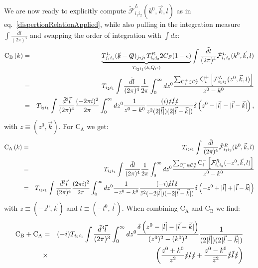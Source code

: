 \documentclass[11pt]{article}
\begin{document}
We are now ready to explicitly compute $\mathcal{\tilde{F}}^{L}_{i_1i_2}(k^0, \vec{k},l)$ as in eq.~\ref{dispertionRelationApplied}, while also pulling in the integration measure $\int \frac{\tilde{d} l}{(2\pi)^4}$ and swapping the order of integration with $\int d z$:
\begin{eqnarray}
\label{CBexplicit}
\textrm{C}_\textrm{B}\left(k \right) &=& \underbrace{T^{L}_{j_1 i_1} (\slashed{k}-\slashed{Q})_{j_2 j_1} T^{R}_{i_2 j_2} 2 C_F (1-\epsilon)  }_{T_{i_2 i_1}(k,Q,\epsilon)}  \int \frac{\tilde{d} l}{(2\pi)^4} \mathcal{\tilde{F}}^{L}_{i_1i_2}(k^0, \vec{k},l) \nonumber\\
&=&T_{i_2 i_1}  \int \frac{\tilde{d} l}{(2\pi)^4}  \frac{1}{2\pi} \int_{0}^\infty d z^0 \frac{ \sum_{\textrm{C}^+_i\in\mathcal{C}_\mathcal{F}^{L}} \textrm{C}^+_i\left[ \mathcal{F}^{L}_{i_1i_2}(z^0, \vec{k},l)\right ] }{z^0-k^0} \nonumber \\
&=&T_{i_2 i_1}  \int \frac{\tilde{d}^3 \vec{l}}{(2\pi)^4}  \frac{(-2\pi i)^2}{2\pi} \int_{0}^\infty d z^0 \frac{1}{z^0-k^0} \frac{(i)\slashed{z}\slashed{l}\slashed{z}}{z^2 (2 |\vec{l}|) (2 |\vec{l}-\vec{k}|)} \delta \left(z^0-|\vec{l}|-|\vec{l}-\vec{k}|\right), \nonumber \\
\end{eqnarray}
with $z\equiv(z^0,\vec{k})$.
For $\textrm{C}_\textrm{A}$ we get:
\begin{eqnarray}
\label{CAexplicit}
\textrm{C}_\textrm{A}\left(k \right) &=& T_{i_2 i_1} \int \frac{\tilde{d} l}{(2\pi)^4} \mathcal{\tilde{F}}^{R}_{i_1i_2}(k^0, \vec{k},l)\nonumber\\
&=&T_{i_2 i_1}  \int \frac{\tilde{d} l}{(2\pi)^4}  \frac{1}{2\pi} \int_{0}^\infty d z^0 \frac{ \sum_{\textrm{C}^-_i\in\mathcal{C}_\mathcal{F}^{R}} \textrm{C}^-_i\left[ \mathcal{F}^{R}_{i_1i_2}(-z^0, \vec{k},l)\right ] }{z^0-k^0} \nonumber \\
&=&T_{i_2 i_1}  \int \frac{\tilde{d}^3 \vec{l}}{(2\pi)^4}  \frac{(2\pi i)^2}{2\pi} \int_{0}^\infty d z^0 \frac{1}{-z^0-k^0} \frac{(-i)\slashed{\bar{z}}\slashed{\bar{l}}\slashed{\bar{z}}}{\bar{z}^2 (-2 |\vec{l}|) (-2 |\vec{l}-\vec{k}|)} \delta \left(-z^0+|\vec{l}|+|\vec{l}-\vec{k}|\right) \nonumber \\
\end{eqnarray}
with $\bar{z}\equiv(-z^0,\vec{k})$ and $\bar{l}\equiv(-l^0,\vec{l})$.
When combining $\textrm{C}_\textrm{A}$ and $\textrm{C}_\textrm{B}$ we find:
\begin{eqnarray}
\textrm{C}_\textrm{B}+ \textrm{C}_\textrm{A} &=& (-i)T_{i_2 i_1}  \int \frac{\tilde{d}^3 \vec{l}}{(2\pi)^3} \int_{0}^\infty d z^0 \frac{\delta \left(z^0-|\vec{l}|-|\vec{l}-\vec{k}|\right)}{(z^0)^2-(k^0)^2} \frac{1}{(2 |\vec{l}|) (2 |\vec{l}-\vec{k}|)} \nonumber \\
&\times&\left( 
\frac{z^0+k^0}{z^2} \slashed{z}\slashed{l}\slashed{z} + \frac{z^0-k^0}{\bar{z}^2} \slashed{\bar{z}}\slashed{\bar{l}}\slashed{\bar{z}}
\right)
\end{eqnarray}
\end{document}
